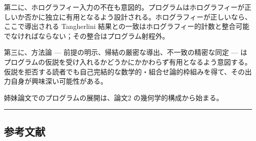 \documentclass[a4paper,11pt]{ltjsarticle}
\theoremstyle{definition}
\begin{document}
第二に、ホログラフィー入力の不在も意図的。プログラムはホログラフィーが正しいか否かに独立に有用となるよう設計される。ホログラフィーが正しいなら、ここで導出される
Tangherlini
結果との一致はホログラフィー的計数と整合可能でなければならない；その整合はプログラム射程外。

第三に、方法論 --- 前提の明示、帰結の厳密な導出、不一致の精密な同定 ---
はプログラムの仮説を受け入れるかどうかにかかわらず有用となるよう意図する。仮説を拒否する読者でも自己完結的な数学的・組合せ論的枠組みを得て、その出力自身が興味深い可能性がある。

姉妹論文でのプログラムの展開は、論文2 の幾何学的構成から始まる。

\begin{center}\rule{0.5\linewidth}{0.5pt}\end{center}

\subsection{参考文献}\label{ux53c2ux8003ux6587ux732e}
\end{document}
